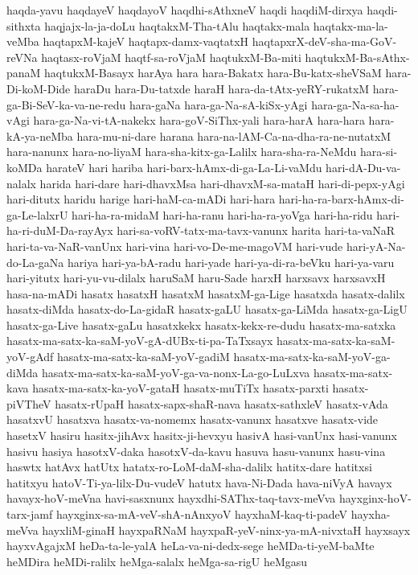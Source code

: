 {haqda-yavu
haqdayeV
haqdayoV
haqdhi-sAthxneV
haqdi
haqdiM-dirxya
haqdi-sithxta
haqjajx-la-ja-doLu
haqtakxM-Tha-tAlu
haqtakx-mala
haqtakx-ma-la-veMba
haqtapxM-kajeV
haqtapx-damx-vaqtatxH
haqtapxrX-deV-sha-ma-GoV-reVNa
haqtasx-roVjaM
haqtf-sa-roVjaM
haqtukxM-Ba-miti
haqtukxM-Ba-sAthx-panaM
haqtukxM-Basayx
harAya
hara
hara-Bakatx
hara-Bu-katx-sheVSaM
hara-Di-koM-Dide
haraDu
hara-Du-tatxde
haraH
hara-da-tAtx-yeRY-rukatxM
hara-ga-Bi-SeV-ka-va-ne-redu
hara-gaNa
hara-ga-Na-sA-kiSx-yAgi
hara-ga-Na-sa-ha-vAgi
hara-ga-Na-vi-tA-nakekx
hara-goV-SiThx-yali
hara-harA
hara-hara
hara-kA-ya-neMba
hara-mu-ni-dare
harana
hara-na-lAM-Ca-na-dha-ra-ne-nutatxM
hara-nanunx
hara-no-liyaM
hara-sha-kitx-ga-Lalilx
hara-sha-ra-NeMdu
hara-si-koMDa
harateV
hari
hariba
hari-barx-hAmx-di-ga-La-Li-vaMdu
hari-dA-Du-va-nalalx
harida
hari-dare
hari-dhavxMsa
hari-dhavxM-sa-mataH
hari-di-pepx-yAgi
hari-ditutx
haridu
harige
hari-haM-ca-mADi
hari-hara
hari-ha-ra-barx-hAmx-di-ga-Le-lalxrU
hari-ha-ra-midaM
hari-ha-ranu
hari-ha-ra-yoVga
hari-ha-ridu
hari-ha-ri-duM-Da-rayAyx
hari-sa-voRV-tatx-ma-tavx-vanunx
harita
hari-ta-vaNaR
hari-ta-va-NaR-vanUnx
hari-vina
hari-vo-De-me-magoVM
hari-vude
hari-yA-Na-do-La-gaNa
hariya
hari-ya-bA-radu
hari-yade
hari-ya-di-ra-beVku
hari-ya-varu
hari-yitutx
hari-yu-vu-dilalx
haruSaM
haru-Sade
harxH
harxsavx
harxsavxH
hasa-na-mADi
hasatx
hasatxH
hasatxM
hasatxM-ga-Lige
hasatxda
hasatx-dalilx
hasatx-diMda
hasatx-do-La-gidaR
hasatx-gaLU
hasatx-ga-LiMda
hasatx-ga-LigU
hasatx-ga-Live
hasatx-gaLu
hasatxkekx
hasatx-kekx-re-dudu
hasatx-ma-satxka
hasatx-ma-satx-ka-saM-yoV-gA-dUBx-ti-pa-TaTxsayx
hasatx-ma-satx-ka-saM-yoV-gAdf
hasatx-ma-satx-ka-saM-yoV-gadiM
hasatx-ma-satx-ka-saM-yoV-ga-diMda
hasatx-ma-satx-ka-saM-yoV-ga-va-nonx-La-go-LuLxva
hasatx-ma-satx-kava
hasatx-ma-satx-ka-yoV-gataH
hasatx-muTiTx
hasatx-parxti
hasatx-piVTheV
hasatx-rUpaH
hasatx-sapx-shaR-nava
hasatx-sathxleV
hasatx-vAda
hasatxvU
hasatxva
hasatx-va-nomemx
hasatx-vanunx
hasatxve
hasatx-vide
hasetxV
hasiru
hasitx-jihAvx
hasitx-ji-hevxyu
hasivA
hasi-vanUnx
hasi-vanunx
hasivu
hasiya
hasotxV-daka
hasotxV-da-kavu
hasuva
hasu-vanunx
hasu-vina
haswtx
hatAvx
hatUtx
hatatx-ro-LoM-daM-sha-dalilx
hatitx-dare
hatitxsi
hatitxyu
hatoV-Ti-ya-lilx-Du-vudeV
hatutx
hava-Ni-Dada
hava-niVyA
havayx
havayx-hoV-meVna
havi-sasxnunx
hayxdhi-SAThx-taq-tavx-meVva
hayxginx-hoV-tarx-jamf
hayxginx-sa-mA-veV-shA-nAnxyoV
hayxhaM-kaq-ti-padeV
hayxha-meVva
hayxliM-ginaH
hayxpaRNaM
hayxpaR-yeV-ninx-ya-mA-nivxtaH
hayxsayx
hayxvAgajxM
heDa-ta-le-yalA
heLa-va-ni-dedx-sege
heMDa-ti-yeM-baMte
heMDira
heMDi-ralilx
heMga-salalx
heMga-sa-rigU
heMgasu
}
